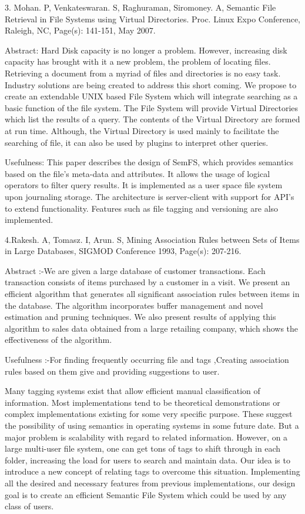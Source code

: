 		3. Mohan. P, Venkateswaran. S, Raghuraman, Siromoney. A, Semantic File Retrieval
		in File Systems using Virtual Directories. Proc. Linux Expo Conference, Raleigh, NC,
		Page(s): 141-151, May 2007.\cite{VIRDIR}
		
		Abstract: Hard Disk capacity is no longer a problem. However, increasing disk capacity
		has brought with it a new problem, the problem of locating files. Retrieving a document
		from a myriad of files and directories is no easy task. Industry solutions are being created
		to address this short coming. We propose to create an extendable UNIX based File
		System which will integrate searching as a basic function of the file system. The File
		System will provide Virtual Directories which list the results of a query. The contents
		of the Virtual Directory are formed at run time. Although, the Virtual Directory is used
		mainly to facilitate the searching of file, it can also be used by plugins to interpret other
		queries.
		
		Usefulness: This paper describes the design of SemFS, which provides semantics
		based on the file's meta-data and attributes. It allows the usage of logical operators to
		filter query results. It is implemented as a user space file system upon journaling storage.
		The architecture is server-client with support for API's to extend functionality. Features
		such as file tagging and versioning are also implemented.
		
		4.Rakesh. A, Tomasz. I, Arun. S, Mining Association Rules between Sets of Items in Large Databases, SIGMOD Conference 1993, Page(s): 207-216.\cite{MiningAssoc}
		
		Abstract :-We are given a large database of customer transactions. Each transaction consists of items purchased by a customer in a visit. We present an efficient algorithm that generates all significant association rules between items in the database. The algorithm incorporates buffer management and novel estimation and pruning techniques. We also present results of applying this algorithm to sales data obtained from a large retailing company, which shows the effectiveness of the algorithm.
		
		Usefulness :-For finding frequently occurring file and tags ,Creating association rules based on them give and providing suggestions to user.
		
		Many tagging systems exist that allow efficient manual classification of information.
		Most implementations tend to be theoretical\cite{SMO2012} demonstrations or complex
		implementations\cite{STMGMTSYS} existing for some very specific purpose. These suggest the
		possibility of using semantics\cite{SMFS2011} in operating systems in some future date. But a
		major problem is scalability with regard to related information. However, on a large
		multi-user file system, one can get tons of tags to shift through in each folder, increasing
		the load for users to search and maintain data. Our idea is to introduce a new concept
		of relating tags to overcome this situation. Implementing all the desired and necessary
		features from previous implementations, our design goal is to create an efficient Semantic
		File System which could be used by any class of users.
				

			

			


